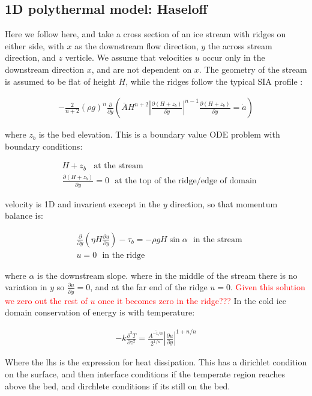 \documentclass[a4paper,12pt]{article}
\newcommand{\pd}[2]{\frac{\partial #1}{\partial #2}}
\newcommand{\pdt}[2]{\frac{\partial^2 #1}{\partial #2 ^2}}
\begin{document}
\subsection{1D polythermal model: Haseloff}

Here we follow \cite{haseloff_2019} here, and take a cross section of an ice stream with ridges on either side, with $x$ as the downstream flow direction, $y$ the across stream direction, and $z$ verticle. We assume that velocities $u$ occur only in the downstream direction $x$, and are not dependent on $x$. The geometry of the stream is assumed to be flat of height $H$, while the ridges follow the typical SIA profile \cite{Greve_2009}:

\begin{align*}
  -\frac{2}{n+2}(\rho g)^n \pd{}{y}\left(\bar{A} H^{n+2}\left|\pd{(H + z_b)}{y}\right|^{n-1}\pd{(H+z_b)}{y} = \dot{a}\right)
\end{align*}

where $z_b$ is the bed elevation. This is a boundary value ODE problem with boundary conditions:

\begin{align*}
  &H + z_b ~~~~ \text{at the stream}\\
  &\pd{(H + z_b)}{y} = 0 ~~~ \text{at the top of the ridge/edge of domain}
\end{align*}

velocity is 1D and invarient execept in the $y$ direction, so that momentum balance is:

\begin{align*}
  &\pd{}{y}\left(\eta H\pd{u}{y}\right) - \tau_b = -\rho g H \sin \alpha ~~~ \text{in the stream}\\
  &u = 0 ~~~ \text{in the ridge}
  \end{align*}

  where $\alpha$ is the downstream slope. where in the middle of the stream there is no variation in $y$ so $\pd{u}{y} = 0$, and at the far end of the ridge $u = 0$. \textcolor{red}{Given this solution we zero out the rest of $u$ once it becomes zero in the ridge???}
  In the cold ice domain conservation of energy is with temperature:

\begin{align*}
  -k\pdt{T}{z} = \frac{\overline{A^{-1/n}}}{2^{1/n}}\left|\pd{u}{y}\right|^{1+n/n}
\end{align*}

Where the lhs is the expression for heat dissipation. This has a dirichlet condition on the surface, and then interface conditions if the temperate region reaches above the bed, and dirchlete conditions if its still on the bed.
\end{document}
